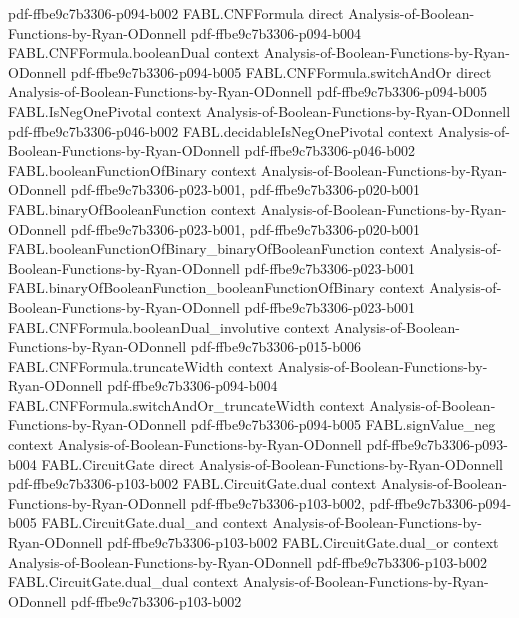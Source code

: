 \begin{theorem}
  {pdf-ffbe9c7b3306-p094-b002}
\proofstep
  {FABL.CNFFormula}
  {direct}
  {Analysis-of-Boolean-Functions-by-Ryan-ODonnell}
  {pdf-ffbe9c7b3306-p094-b004}
\proofstep
  {FABL.CNFFormula.booleanDual}
  {context}
  {Analysis-of-Boolean-Functions-by-Ryan-ODonnell}
  {pdf-ffbe9c7b3306-p094-b005}
\proofstep
  {FABL.CNFFormula.switchAndOr}
  {direct}
  {Analysis-of-Boolean-Functions-by-Ryan-ODonnell}
  {pdf-ffbe9c7b3306-p094-b005}
\proofstep
  {FABL.IsNegOnePivotal}
  {context}
  {Analysis-of-Boolean-Functions-by-Ryan-ODonnell}
  {pdf-ffbe9c7b3306-p046-b002}
\proofstep
  {FABL.decidableIsNegOnePivotal}
  {context}
  {Analysis-of-Boolean-Functions-by-Ryan-ODonnell}
  {pdf-ffbe9c7b3306-p046-b002}
\proofstep
  {FABL.booleanFunctionOfBinary}
  {context}
  {Analysis-of-Boolean-Functions-by-Ryan-ODonnell}
  {pdf-ffbe9c7b3306-p023-b001,
    pdf-ffbe9c7b3306-p020-b001}
\proofstep
  {FABL.binaryOfBooleanFunction}
  {context}
  {Analysis-of-Boolean-Functions-by-Ryan-ODonnell}
  {pdf-ffbe9c7b3306-p023-b001,
    pdf-ffbe9c7b3306-p020-b001}
\proofstep
  {FABL.booleanFunctionOfBinary_binaryOfBooleanFunction}
  {context}
  {Analysis-of-Boolean-Functions-by-Ryan-ODonnell}
  {pdf-ffbe9c7b3306-p023-b001}
\proofstep
  {FABL.binaryOfBooleanFunction_booleanFunctionOfBinary}
  {context}
  {Analysis-of-Boolean-Functions-by-Ryan-ODonnell}
  {pdf-ffbe9c7b3306-p023-b001}
\proofstep
  {FABL.CNFFormula.booleanDual_involutive}
  {context}
  {Analysis-of-Boolean-Functions-by-Ryan-ODonnell}
  {pdf-ffbe9c7b3306-p015-b006}
\proofstep
  {FABL.CNFFormula.truncateWidth}
  {context}
  {Analysis-of-Boolean-Functions-by-Ryan-ODonnell}
  {pdf-ffbe9c7b3306-p094-b004}
\proofstep
  {FABL.CNFFormula.switchAndOr_truncateWidth}
  {context}
  {Analysis-of-Boolean-Functions-by-Ryan-ODonnell}
  {pdf-ffbe9c7b3306-p094-b005}
\proofstep
  {FABL.signValue_neg}
  {context}
  {Analysis-of-Boolean-Functions-by-Ryan-ODonnell}
  {pdf-ffbe9c7b3306-p093-b004}
\proofstep
  {FABL.CircuitGate}
  {direct}
  {Analysis-of-Boolean-Functions-by-Ryan-ODonnell}
  {pdf-ffbe9c7b3306-p103-b002}
\proofstep
  {FABL.CircuitGate.dual}
  {context}
  {Analysis-of-Boolean-Functions-by-Ryan-ODonnell}
  {pdf-ffbe9c7b3306-p103-b002,
    pdf-ffbe9c7b3306-p094-b005}
\proofstep
  {FABL.CircuitGate.dual_and}
  {context}
  {Analysis-of-Boolean-Functions-by-Ryan-ODonnell}
  {pdf-ffbe9c7b3306-p103-b002}
\proofstep
  {FABL.CircuitGate.dual_or}
  {context}
  {Analysis-of-Boolean-Functions-by-Ryan-ODonnell}
  {pdf-ffbe9c7b3306-p103-b002}
\proofstep
  {FABL.CircuitGate.dual_dual}
  {context}
  {Analysis-of-Boolean-Functions-by-Ryan-ODonnell}
  {pdf-ffbe9c7b3306-p103-b002}

\end{theorem}
